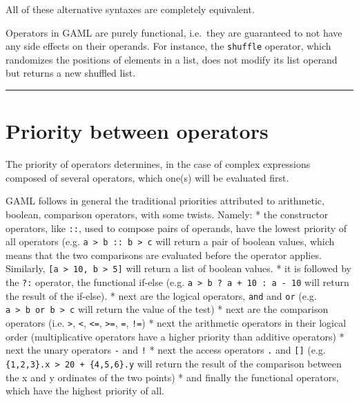 \documentclass[]{book}
\theoremstyle{definition}
\theoremstyle{definition}
\theoremstyle{definition}
\theoremstyle{remark}
\begin{document}
All of these alternative syntaxes are completely equivalent.

Operators in GAML are purely functional, i.e.~they are guaranteed to not
have any side effects on their operands. For instance, the
\texttt{shuffle} operator, which randomizes the positions of elements in
a list, does not modify its list operand but returns a new shuffled
list.

\begin{center}\rule{0.5\linewidth}{\linethickness}\end{center}

\section{Priority between operators}\label{priority-between-operators-4}

The priority of operators determines, in the case of complex expressions
composed of several operators, which one(s) will be evaluated first.

GAML follows in general the traditional priorities attributed to
arithmetic, boolean, comparison operators, with some twists. Namely: *
the constructor operators, like \texttt{::}, used to compose pairs of
operands, have the lowest priority of all operators (e.g.
\texttt{a\ \textgreater{}\ b\ ::\ b\ \textgreater{}\ c} will return a
pair of boolean values, which means that the two comparisons are
evaluated before the operator applies. Similarly,
\texttt{{[}a\ \textgreater{}\ 10,\ b\ \textgreater{}\ 5{]}} will return
a list of boolean values. * it is followed by the \texttt{?:} operator,
the functional if-else (e.g.
\texttt{a\ \textgreater{}\ b\ ?\ a\ +\ 10\ :\ a\ -\ 10} will return the
result of the if-else). * next are the logical operators, \texttt{and}
and \texttt{or} (e.g.
\texttt{a\ \textgreater{}\ b\ or\ b\ \textgreater{}\ c} will return the
value of the test) * next are the comparison operators (i.e.
\texttt{\textgreater{}}, \texttt{\textless{}}, \texttt{\textless{}=},
\texttt{\textgreater{}=}, \texttt{=}, \texttt{!=}) * next the arithmetic
operators in their logical order (multiplicative operators have a higher
priority than additive operators) * next the unary operators \texttt{-}
and \texttt{!} * next the access operators \texttt{.} and
\texttt{{[}{]}} (e.g.
\texttt{\{1,2,3\}.x\ \textgreater{}\ 20\ +\ \{4,5,6\}.y} will return the
result of the comparison between the x and y ordinates of the two
points) * and finally the functional operators, which have the highest
priority of all.
\end{document}
